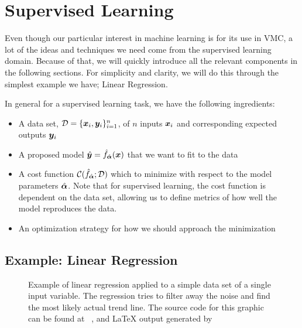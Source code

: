 \documentclass[Thesis.tex]{subfiles}
\begin{document}
\section{Supervised Learning}

Even though our particular interest in machine learning is for its use in VMC, a
lot of the ideas and techniques we need come from the supervised learning
domain. Because of that, we will quickly introduce all the relevant components in the
following sections. For simplicity and clarity, we will do this through the
simplest example we have; Linear Regression.

In general for a supervised learning task, we have the following ingredients:

\begin{itemize}
\item A data set, $\mathcal{D} = \{\bm{x}_i, \bm{y}_i\}_{i=1}^n$, of $n$ inputs $\bm{x}_i$
  and corresponding expected outputs $\bm{y}_i$
\item A proposed model $\hat{\bm{y}} = \hat f_{\hat{\bm{\alpha}}}(\bm{x})$ that we want to
    fit to the data
\item A cost function $\mathcal{C}(\hat f_{\hat{\bm{\alpha}}}; \mathcal{D})$ which
  to minimize with respect to the model parameters $\hat {\bm{\alpha}}$. Note that for
  supervised learning, the cost function is dependent on the data set, allowing
  us to define metrics of how well the model reproduces the data.
\item An optimization strategy for how we should approach the minimization
\end{itemize}


\subsection{Example: Linear Regression}

\begin{figure}[h]
  \centering
  \resizebox{0.7\linewidth}{!}{%
      
  }
  \caption{Example of linear regression applied to a simple data set of a single
    input variable. The regression tries to filter away the noise and find the
    most likely actual trend line. The source code for this graphic can be found
    at ~\cite[TODO: Add
    path]{MS-thesis-repository}, and \LaTeX{} output generated
    by~\cite{nico_schlomer_2018_1173090}}
  \label{fig:linear-regression-example}
\end{figure}
\end{document}
